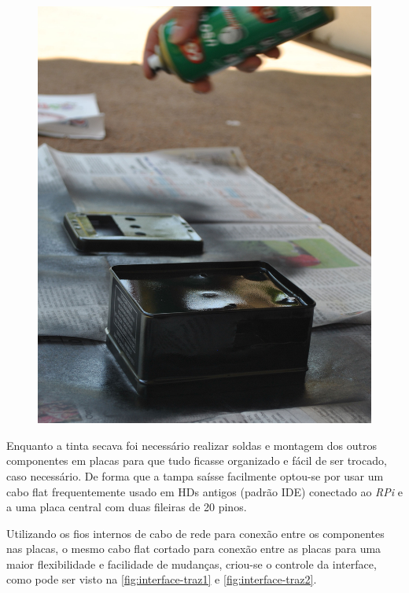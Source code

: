 \documentclass[
		12pt,				%
		openright,			%
		oneside,			%
		a4paper,			%
		chapter=TITLE,		%
		english,			%
		brazil				%
	]{abntex2}
\begin{document}
\begin{figure}[htb]
\begin{minipage}{0.47\textwidth}
		\includegraphics[width=1\textwidth]{img/pintar-2.jpg}
	\end{minipage}
\end{figure}

Enquanto a tinta secava foi necessário realizar soldas e montagem dos outros componentes em placas para que tudo ficasse organizado e fácil de ser trocado, caso necessário. De forma que a tampa saísse facilmente optou-se por usar um cabo flat frequentemente usado em HDs antigos (padrão IDE) conectado ao \textit{RPi} e a uma placa central com duas fileiras de 20 pinos.

Utilizando os fios internos de cabo de rede para conexão entre os componentes nas placas, o mesmo cabo flat cortado para conexão entre as placas para uma maior flexibilidade e facilidade de mudanças, criou-se o controle da interface, como pode ser visto na \autoref{fig:interface-traz1} e \autoref{fig:interface-traz2}.
\end{document}
